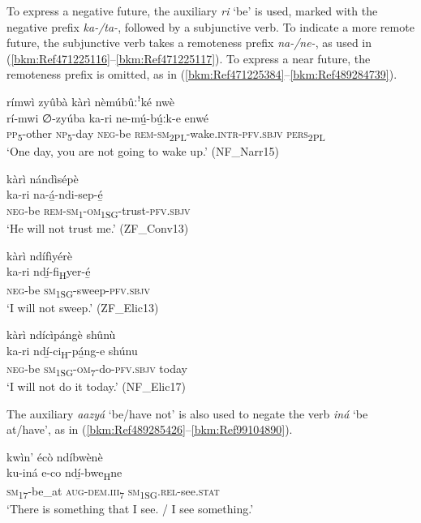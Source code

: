 To express a negative future, the auxiliary \textit{ri} ‘be’ is used, marked with the negative prefix \textit{ka-/ta-}, followed by a subjunctive verb. To indicate a more remote future, the subjunctive verb takes a remoteness prefix \textit{na-/ne-}, as used in (\ref{bkm:Ref471225116}--\ref{bkm:Ref471225117}). To express a near future, the remoteness prefix is omitted, as in (\ref{bkm:Ref471225384}--\ref{bkm:Ref489284739}).

\ea
\label{bkm:Ref471225116}
rímwì zyûbà kàrì nèmúbûːꜝké nwè\\
\gll rí-mwi  ∅-zyúba ka-ri    ne-mú̲-bú̲ːk-e      enwé \\
\textsc{pp}\textsubscript{5}-other  \textsc{np}\textsubscript{5}-day
\textsc{neg}-be  \textsc{rem}-\textsc{sm}\textsubscript{2PL}-wake.\textsc{intr}-\textsc{pfv}.\textsc{sbjv}  \textsc{pers}\textsubscript{2PL}\\
\glt ‘One day, you are not going to wake up.’ (NF\_Narr15)
\z

\ea
\label{bkm:Ref471225117}
kàrì nándìsépè\\
\gll ka-ri    na-á̲-ndi-sep-é̲\\
\textsc{neg}-be  \textsc{rem}-\textsc{sm}\textsubscript{1}-\textsc{om}\textsubscript{1SG}-trust-\textsc{pfv}.\textsc{sbjv}\\
\glt ‘He will not trust me.’ (ZF\_Conv13)
\z

\ea
\label{bkm:Ref471225384}
kàrì ndífìyérè\\
\gll ka-ri    ndí̲-fi\textsubscript{H}yer-é̲\\
\textsc{neg}-be  \textsc{sm}\textsubscript{1SG}-sweep-\textsc{pfv}.\textsc{sbjv}\\
\glt ‘I will not sweep.’ (ZF\_Elic13)
\z

\ea
\label{bkm:Ref489284739}
kàrì ndícìpángè shûnù\\
\gll ka-ri    ndí̲-ci\textsubscript{H}-pá̲ng-e    shúnu\\
\textsc{neg}-be  \textsc{sm}\textsubscript{1SG}-\textsc{om}\textsubscript{7}-do-\textsc{pfv}.\textsc{sbjv}  today\\
\glt ‘I will not do it today.’ (NF\_Elic17)
\z

\begin{sloppypar}
The auxiliary \textit{aazyá} ‘be/have not’ is also used to negate the verb \textit{iná} ‘be at/have’, as in (\ref{bkm:Ref489285426}--\ref{bkm:Ref99104890}).
\end{sloppypar}

\ea
\label{bkm:Ref489285426}
kwìn’ écò ndíbwènè\\
\gll ku-iná    e-co    ndí̲-bwe\textsubscript{H}ne\\
\textsc{sm}\textsubscript{17}-be\_at  \textsc{aug}-\textsc{dem}.\textsc{iii}\textsubscript{7}  \textsc{sm}\textsubscript{1SG}.\textsc{rel}-see.\textsc{stat}\\
\glt ‘There is something that I see. / I see something.’
\z

